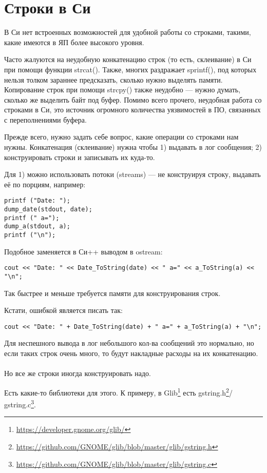 \section{Строки в Си}

В Си нет встроенных возможностей для удобной работы со строками, такими, какие имеются в ЯП более
высокого уровня.

Часто жалуются на неудобную
конкатенацию строк (то есть, склеивание) в Си при помощи функции strcat(). Также, многих раздражает sprintf(),
под которых нельзя толком зараннее предсказать, сколько нужно выделять памяти. Копирование строк при помощи
strcpy() также неудобно --- нужно думать, сколько же выделить байт под буфер. Помимо всего прочего, неудобная
работа со строками в Си, это источник огромного количества уязвимостей в ПО, связанных с переполнениями буфера\cite[1.14.2]{REBook}.

Прежде всего, нужно задать себе вопрос, какие операции со строками нам нужны.
Конкатенация (склеивание) нужна чтобы 1) выдавать в лог сообщения; 2) конструировать строки и записывать их куда-то.

Для 1) можно использовать потоки (streams) --- не конструируя строку, выдавать её по порциям, например:

\begin{lstlisting}
printf ("Date: ");
dump_date(stdout, date);
printf (" a=");
dump_a(stdout, a);
printf ("\n");
\end{lstlisting}

Подобное заменяется в Си++ выводом в ostream:

\begin{lstlisting}
cout << "Date: " << Date_ToString(date) << " a=" << a_ToString(a) << "\n";
\end{lstlisting}

Так быстрее и меньше требуется памяти для конструирования строк.

Кстати, ошибкой является писать так:

\begin{lstlisting}
cout << "Date: " + Date_ToString(date) + " a=" + a_ToString(a) + "\n";
\end{lstlisting}

Для неспешного вывода в лог небольшого кол-ва сообщений это нормально, но если таких строк очень много, то будут
накладные расходы на их конкатенацию. \\
\\
Но все же строки иногда конструировать надо.

Есть какие-то библиотеки для этого.
К примеру, в Glib\footnote{\url{https://developer.gnome.org/glib/}} есть 
gstring.h\footnote{\url{https://github.com/GNOME/glib/blob/master/glib/gstring.h}}/
gstring.c\footnote{\url{https://github.com/GNOME/glib/blob/master/glib/gstring.c}}. 

